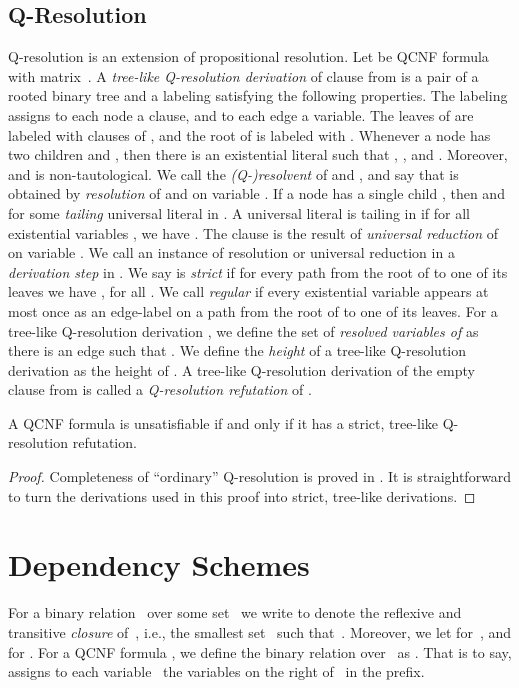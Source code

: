\documentclass{llncs}
\def\hy{\hbox{-}\nobreak\hskip0pt} \newcommand{\ellipsis}{}
\begin{document}
\subsection{Q\hy Resolution}
Q\hy resolution \cite{KleinebuningKarpinskiFlogel95} is an extension of
propositional resolution. Let  be QCNF formula with matrix~. A
\emph{tree-like Q\hy resolution derivation} of clause  from  is a
pair  of a rooted binary tree  and a labeling 
satisfying the following properties. The labeling  assigns to each
node a clause, and to each edge a variable. The leaves of  are labeled with
clauses of , and the root of  is labeled with . Whenever a node 
has two children  and , then there is an existential literal 
such that , , and
. Moreover,  and  is non-tautological. We call
 the \emph{(Q-)resolvent} of  and , and
say that  is obtained by \emph{resolution} of  and
 on variable . If a node  has a single child
, then  and  for some \emph{tailing} universal literal  in
. A universal literal  is tailing in  if for
all existential variables , we have . The clause  is the result of
\emph{universal reduction} of  on variable . We call
an instance of resolution or universal reduction in  a \emph{derivation
  step} in . We say  is \emph{strict} if for every path  from the root of  to one of its leaves we have
,
for all .  We call  \emph{regular} if every
existential variable appears at most once as an edge-label on a path from the
root of  to one of its leaves. For a tree\hy like Q\hy resolution
derivation , we define the set of \emph{resolved variables
  of}  as 
there is an edge  such that . We define the
\emph{height} of a tree\hy like Q\hy resolution derivation 
as the height of . A tree\hy like Q\hy resolution derivation of the empty
clause from  is called a \emph{Q\hy resolution refutation} of .
\begin{theorem}\label{ThmStrictQres}A QCNF formula  is unsatisfiable if and only if it has a
  strict, tree-like Q\hy resolution refutation.
\end{theorem}
\begin{proof}
  Completeness of ``ordinary'' Q-resolution is proved in
  \cite{KleinebuningKarpinskiFlogel95}. It is straightforward to turn the
  derivations used in this proof into strict, tree\hy like derivations.
\end{proof}

\section{Dependency Schemes}
For a binary relation~ over some set~ we write  to denote the
reflexive and transitive \emph{closure} of~, i.e., the smallest
set~ such that~. Moreover, we let  for~, and
 for . For a QCNF formula
, we define the binary relation  over~ as . That is to say,  assigns to each variable~ the variables on
the right of~ in the prefix.
\end{document}
